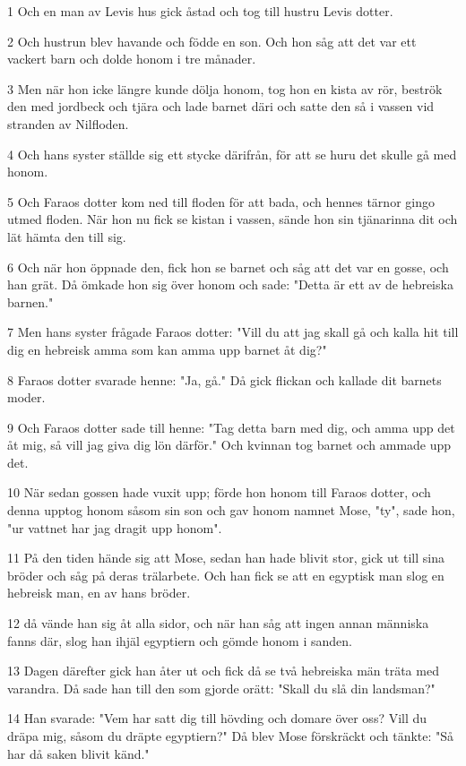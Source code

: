 \par 1 Och en man av Levis hus gick åstad och tog till hustru Levis dotter.
\par 2 Och hustrun blev havande och födde en son. Och hon såg att det var ett vackert barn och dolde honom i tre månader.
\par 3 Men när hon icke längre kunde dölja honom, tog hon en kista av rör, beströk den med jordbeck och tjära och lade barnet däri och satte den så i vassen vid stranden av Nilfloden.
\par 4 Och hans syster ställde sig ett stycke därifrån, för att se huru det skulle gå med honom.
\par 5 Och Faraos dotter kom ned till floden för att bada, och hennes tärnor gingo utmed floden. När hon nu fick se kistan i vassen, sände hon sin tjänarinna dit och lät hämta den till sig.
\par 6 Och när hon öppnade den, fick hon se barnet och såg att det var en gosse, och han grät. Då ömkade hon sig över honom och sade: "Detta är ett av de hebreiska barnen."
\par 7 Men hans syster frågade Faraos dotter: "Vill du att jag skall gå och kalla hit till dig en hebreisk amma som kan amma upp barnet åt dig?"
\par 8 Faraos dotter svarade henne: "Ja, gå." Då gick flickan och kallade dit barnets moder.
\par 9 Och Faraos dotter sade till henne: "Tag detta barn med dig, och amma upp det åt mig, så vill jag giva dig lön därför." Och kvinnan tog barnet och ammade upp det.
\par 10 När sedan gossen hade vuxit upp; förde hon honom till Faraos dotter, och denna upptog honom såsom sin son och gav honom namnet Mose, "ty", sade hon, "ur vattnet har jag dragit upp honom".
\par 11 På den tiden hände sig att Mose, sedan han hade blivit stor, gick ut till sina bröder och såg på deras trälarbete. Och han fick se att en egyptisk man slog en hebreisk man, en av hans bröder.
\par 12 då vände han sig åt alla sidor, och när han såg att ingen annan människa fanns där, slog han ihjäl egyptiern och gömde honom i sanden.
\par 13 Dagen därefter gick han åter ut och fick då se två hebreiska män träta med varandra. Då sade han till den som gjorde orätt: "Skall du slå din landsman?"
\par 14 Han svarade: "Vem har satt dig till hövding och domare över oss? Vill du dräpa mig, såsom du dräpte egyptiern?" Då blev Mose förskräckt och tänkte: "Så har då saken blivit känd."
